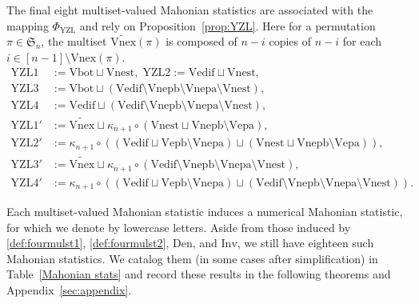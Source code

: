 \documentclass[12pt]{amsart}
\numberwithin{equation}{section}
\theoremstyle{plain}
\theoremstyle{definition}
\def\YZL{\mathrm{YZL}}
\def\SS{\mathfrak{S}}
\def\Excp{\mathrm{Ep}}
\def\Vnexpb{\mathrm{Vnepb}}
\def\Vnexpa{\mathrm{Vnepa}}
\def\Vexpb{\mathrm{Vepb}}
\def\Vexpa{\mathrm{Vepa}}
\def\Vedif{\mathrm{Vedif}}
\def\Vbot{\mathrm{Vbot}}
\def\Vnex{\mathrm{Vnex}}
\def\Vnest{\mathrm{Vnest}}
\def\pone{\mathrm{pone}}
\def\Inv{\mathrm{Inv}}
\def\Den{\mathrm{Den}}
\def\YZLone{\mathrm{YZL1}}
\def\YZLtwo{\mathrm{YZL2}}
\def\YZLthree{\mathrm{YZL3}}
\def\YZLfour{\mathrm{YZL4}}
\begin{document}
The final eight multiset-valued Mahonian statistics are associated with the mapping $\Phi_{\YZL}$ and rely on Proposition~\ref{prop:YZL}. Here for a permutation $\pi\in\SS_n$, the multiset $\widetilde{\Vnex}(\pi)$ is composed of $n-i$ copies of $n-i$ for each $i\in[n-1]\setminus\Vnex(\pi)$.
\begin{align*}
\YZLone &:=\Vbot \sqcup \Vnest, \; \YZLtwo :=\Vedif \sqcup \Vnest, \\
\YZLthree &:=\Vbot \sqcup (\Vedif \setminus\Vnexpb\setminus\Vnexpa\setminus\Vnest),\\
\YZLfour &:=\Vedif \sqcup (\Vedif \setminus\Vnexpb\setminus\Vnexpa\setminus\Vnest), \\
  \YZLone' &:=\widetilde{\Vnex} \sqcup
\kappa_{n+1}\circ(\Vnest \sqcup\Vnexpb \setminus \Vexpa), \\
  \YZLtwo' &:=\kappa_{n+1}\circ((\Vedif \sqcup\Vexpb \setminus \Vnexpa) \sqcup (\Vnest \sqcup\Vnexpb \setminus \Vexpa)), \\
  \YZLthree' &:=\widetilde{\Vnex} \sqcup
   \kappa_{n+1}\circ(\Vedif \setminus\Vnexpb\setminus\Vnexpa\setminus\Vnest), \\
  \YZLfour' &:=\kappa_{n+1}\circ((\Vedif \sqcup\Vexpb \setminus \Vnexpa) \sqcup (\Vedif \setminus\Vnexpb\setminus\Vnexpa\setminus\Vnest)).
\end{align*}

Each multiset-valued Mahonian statistic induces a numerical Mahonian statistic, for which we denote by lowercase letters. Aside from those induced by \eqref{def:fourmulst1}, \eqref{def:fourmulst2}, $\Den$, and $\Inv$, we still have eighteen such Mahonian statistics. We catalog them (in some cases after simplification) in Table~\ref{Mahonian stats} and record these results in the following theorems and Appendix~\ref{sec:appendix}.
\end{document}
